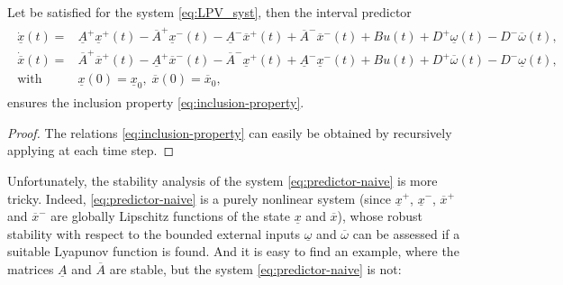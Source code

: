 \begin{proposition}
	\label{prop:interval-predictor-naive}
	\begin{leftbar}[propositionbar]
		Let  be satisfied for the system \eqref{eq:LPV_syst}, then the interval predictor
		\begin{align}
		\label{eq:predictor-naive}
		\begin{split}
		\dot{\underline{x}}(t) = {} & \underline{A}^{+}\underline{x}^{+}(t)-\overline{A}^{+}\underline{x}^{-}(t)-\underline{A}^{-}\overline{x}^{+}(t) +\overline{A}^{-}\overline{x}^{-}(t) + Bu(t)+D^{+}\underline{\omega}(t)-D^{-}\overline{\omega}(t),\\
		\dot{\overline{x}}(t) =  {} & \overline{A}^{+}\overline{x}^{+}(t)-\underline{A}^{+}\overline{x}^{-}(t)-\overline{A}^{-}\underline{x}^{+}(t) +\underline{A}^{-}\underline{x}^{-}(t) + Bu(t) +D^{+}\overline{\omega}(t)-D^{-}\underline{\omega}(t), \\
		\text{with }\, & \underline{x}(0)=  \underline{x}_{0},\;\overline{x}(0)=\overline{x}_{0}, 
		\end{split}
		\end{align}
		ensures the inclusion property \eqref{eq:inclusion-property}. 
	\end{leftbar}
\end{proposition}
\begin{proof}
	The relations \eqref{eq:inclusion-property} can easily be obtained by recursively applying  at each time step.
\end{proof}
Unfortunately, the stability analysis of the system \eqref{eq:predictor-naive} is more tricky. Indeed, \eqref{eq:predictor-naive} is a purely nonlinear system (since $\underline{x}^{+}$, $\underline{x}^{-}$, $\overline{x}^{+}$ and $\overline{x}^{-}$ are globally Lipschitz functions of the state $\underline{x}$ and $\overline{x}$), whose robust stability with respect to the bounded external inputs $\underline{\omega}$ and $\overline{\omega}$ can be assessed if a suitable Lyapunov function is found. And it is easy to find an example, where the matrices $\underline{A}$ and $\overline{A}$ are stable, but the system \eqref{eq:predictor-naive} is not:
